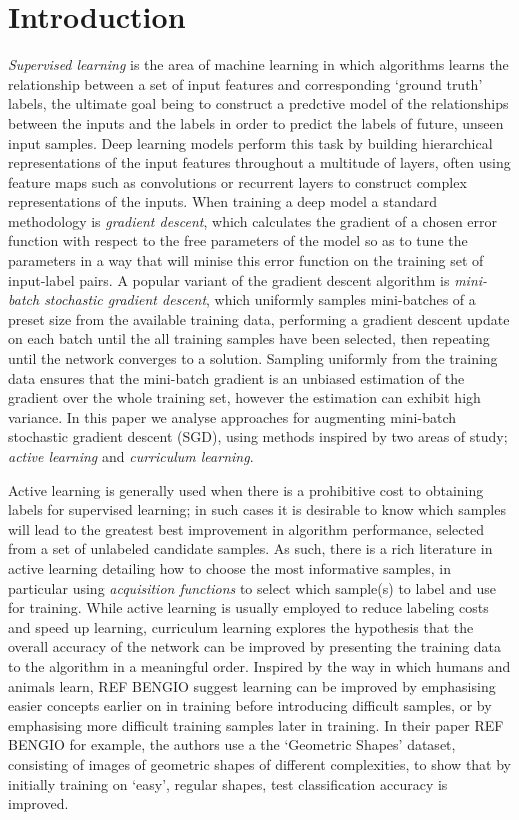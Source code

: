 \chapter{Introduction}

\textit{Supervised learning} is the area of machine learning in which algorithms learns the relationship between a set of input features and corresponding `ground truth' labels, the ultimate goal being to construct a predctive model of the relationships between the inputs and the labels in order to predict the labels of future, unseen input samples. Deep learning models perform this task by building hierarchical representations of the input features throughout a multitude of layers, often using feature maps such as convolutions or recurrent layers to construct complex representations of the inputs. When training a deep model a standard methodology is \textit{gradient descent}, which calculates the gradient of a chosen error function with respect to the free parameters of the model so as to tune the parameters in a way that will minise this error function on the training set of input-label pairs. A popular variant of the gradient descent algorithm is \textit{mini-batch stochastic gradient descent}, which uniformly samples mini-batches of a preset size from the available training data, performing a gradient descent update on each batch until the all training samples have been selected, then repeating until the network converges to a solution. Sampling uniformly from the training data ensures that the mini-batch gradient is an unbiased estimation of the gradient over the whole training set, however the estimation can exhibit high variance. In this paper we analyse approaches for augmenting mini-batch stochastic gradient descent (SGD), using methods inspired by two areas of study; \textit{active learning} and \textit{curriculum learning}. 

Active learning is generally used when there is a prohibitive cost to obtaining labels for supervised learning; in such cases it is desirable to know which samples will lead to the greatest best improvement in algorithm performance, selected from a set of unlabeled candidate samples. As such, there is a rich literature in active learning detailing how to choose the most informative samples, in particular using \textit{acquisition functions} to select which sample(s) to label and use for training. While active learning is usually employed to reduce labeling costs and speed up learning, curriculum learning explores the hypothesis that the overall accuracy of the network can be improved by presenting the training data to the algorithm in a meaningful order. Inspired by the way in which humans and animals learn, REF BENGIO suggest learning can be improved by emphasising easier concepts earlier on in training before introducing difficult samples, or by emphasising more difficult training samples later in training. In their paper REF BENGIO for example, the authors use a the `Geometric Shapes' dataset, consisting of images of geometric shapes of different complexities, to show that by initially training on `easy', regular shapes, test classification accuracy is improved. 

